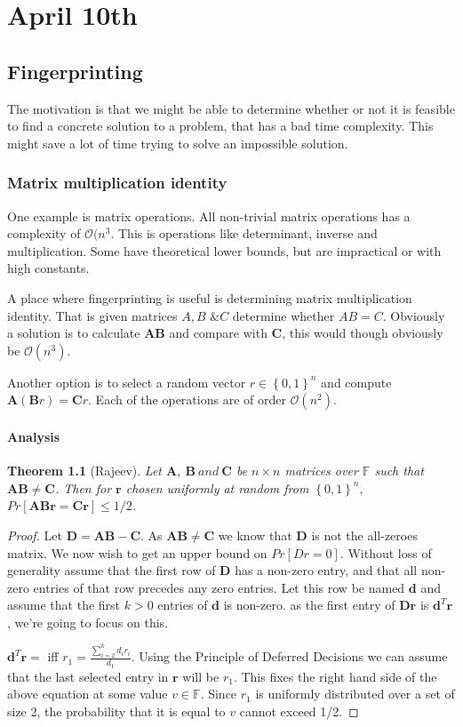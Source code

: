 \documentclass{report}
\newtheorem{thm}{Theorem}
\newcommand{\+}[1]{\ensuremath{\boldsymbol{#1}}}
\begin{document}
\chapter{April 10th}
\section{Fingerprinting}
The motivation is that we might be able to determine whether or not it is feasible to find a concrete solution to a problem, that has a bad time complexity.
This might save a lot of time trying to solve an impossible solution.
\par
\subsection{Matrix multiplication identity}
One example is matrix operations. All non-trivial matrix operations has a complexity of $\mathcal{O}(n^3$. This is operations like determinant, inverse and multiplication. Some have theoretical lower bounds, but are impractical or with high constants.
\par
A place where fingerprinting is useful is determining matrix multiplication identity. That is given matrices $A, B \text{ \& } C$ determine whether $AB = C$.
Obviously a solution is to calculate $\+A\+B$ and compare with $\+C$, this would though obviously be $\mathcal{O}(n^3)$.
\par
Another option is to select a random vector $r \in \left\{0,1\right\}^n$ and compute $\+A(\+Br)= \+Cr$. Each of the operations are of order $\mathcal{O}(n^2)$.
\subsubsection{Analysis}
\begin{thm}[Rajeev]\label{matrixfingerprinting}
Let $\+A,\ \+B\ and\ \+C$ be $n \times n$ matrices over $\mathbb{F}$ such that $\+A\+B \neq \+C$. Then for $\+{r}$ chosen uniformly at random from $\left\{0,1\right\}^n,$\\ $Pr[\+A\+B\+r = \+C\+r] \leq 1/2$.\\
\end{thm}
\begin{proof}
Let $\+D = \+A\+B-\+C$. As $\+A\+B \neq \+C$ we know that $\+D$ is not the all-zeroes matrix. We now wish to get an upper bound on $Pr[Dr = 0]$. Without loss of generality assume that the first row of $\+D$ has a non-zero entry, and that all non-zero entries of that row precedes any zero entries. 
Let this row be named $\+d$ and assume that the first $k > 0$ entries of $\+d$ is non-zero.
as the first entry of $\+D\+r$ is $\+d^T\+r$, we're going to focus on this.
\par
$\+d^T\+r =$ iff $r_1 = \frac{\sum_{i=2}^{k}d_ir_i}{d_1}$.
Using the Principle of Deferred Decisions we can assume that the last selected entry in $\+r$ will be $r_1$. This fixes the right hand side of the above equation at some value $v \in \mathbb{F}$. Since $r_1$ is uniformly distributed over a set of size 2, the probability that it is equal to $v$ cannot exceed 1/2.
\end{proof}
\end{document}
